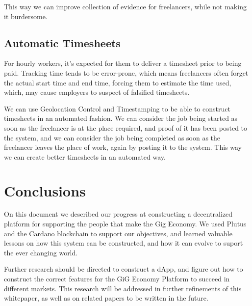 \documentclass{article}
\begin{document}
This way we can improve collection of evidence for freelancers, while not making it burdersome.

\subsection{Automatic Timesheets}

For hourly workers, it's expected for them to deliver a timesheet prior to being paid. Tracking time tends to be error-prone, which means freelancers often forget the actual start time and end time, forcing them to estimate the time used, which, may cause employers to suspect of falsified timesheets.

We can use Geolocation Control and Timestamping to be able to construct timesheets in an automated fashion. We can consider the job being started as soon as the freelancer is at the place required, and proof of it has been posted to the system, and we can consider the job being completed as soon as the freelancer leaves the place of work, again by posting it to the system. This way we can create better timesheets in an automated way.

\section{Conclusions}

On this document we described our progress at constructing a decentralized platform for supporting the people that make the Gig Economy. We used Plutus and the Cardano blockchain to support our objectives, and learned valuable lessons on how this system can be constructed, and how it can evolve to suport the ever changing world.

Further research should be directed to construct a dApp, and figure out how to construct the correct features for the GiG Economy Platform to succeed in different markets. This research will be addressed in further refinements of this whitepaper, as well as on related papers to be written in the future.
\end{document}
